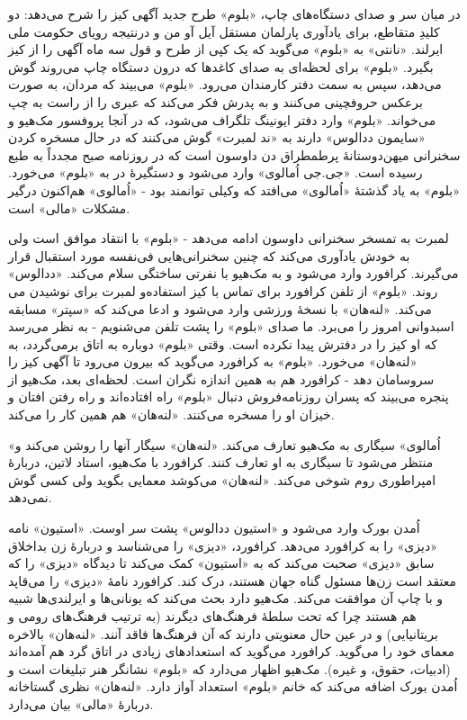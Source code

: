 \documentclass[12pt]{book}
\newcommand{\noun}[1]{«{#1}»}
\begin{document}
    در میان سر و صدای دستگاه‌های چاپ، \noun{بلوم} طرح جدید آگهی کیز را شرح می‌دهد: دو کلیدِ متقاطع، برای یادآوری پارلمان مستقل آیل آو من و درنتیجه رویای حکومت ملی ایرلند. \noun{نانتی} به \noun{بلوم} می‌گوید که یک کپی از طرح و قول سه ماه آگهی را از کیز بگیرد. \noun{بلوم} برای لحظه‌ای به صدای کاغدها که درون دستگاه چاپ می‌روند گوش می‌دهد، سپس به سمت دفتر کارمندان می‌رود. \noun{بلوم} می‌بیند که مردان، به صورت برعکس حروفچینی می‌کنند و به پدرش فکر می‌کند که عبری را از راست به چپ می‌خواند. \noun{بلوم} وارد دفتر ایونینگ تلگراف می‌شود، که در آنجا پروفسور مک‌هیو و \noun{سایمون ددالوس‬} دارند به \noun{ند لمبرت} گوش می‌کنند که در حال مسخره کردن سخنرانی میهن‌دوستانۀ پرطمطراق دن داوسون است که در روزنامه صبح مجدداً به طبع رسیده است. \noun{جی.جی اُمالوی} وارد می‌شود و دستگیرۀ در به \noun{بلوم} می‌خورد. \noun{بلوم} به یاد گذشتۀ \noun{اُمالوی} می‌افتد که وکیلی توانمند بود - \noun{اُمالوی} هم‌اکنون درگیر مشکلات \noun{مالی} است.

    لمبرت به تمسخر سخنرانی داوسون ادامه می‌دهد - \noun{بلوم} با انتقاد موافق است ولی به خودش یادآوری می‌کند که چنین سخنرانی‌هایی فی‌نفسه مورد استقبال قرار می‌گیرند. کرافورد وارد می‌شود و به مک‌هیو با نفرتی ساختگی سلام می‌کند. \noun{ددالوس} و لمبرت برای نوشیدن می‎‌روند. \noun{بلوم} از تلفن کرافورد برای تماس با کیز استفاده می‌کند. \noun{لنه‌هان} با نسخۀ ورزشی وارد می‌شود و ادعا می‌کند که \noun{سپتر} مسابقه اسبدوانی امروز را می‌برد. ما صدای \noun{بلوم} را پشت تلفن می‌شنویم - به نظر می‌رسد که او کیز را در دفترش پیدا نکرده است. وقتی \noun{بلوم} دوباره به اتاق برمی‌گردد، به \noun{لنه‌هان} می‌خورد. \noun{بلوم} به کرافورد می‌گوید که بیرون می‌رود تا آگهی کیز را سروسامان دهد - کرافورد هم به همین اندازه نگران است. لحظه‌ای بعد، مک‌هیو از پنجره می‌بیند که پسران روزنامه‌فروش دنبال \noun{بلوم} راه افتاده‌اند و راه رفتن افتان و خیزان او را مسخره می‌کنند. \noun{لنه‌هان} هم همین کار را می‌کند.

    \noun{اُمالوی} سیگاری به مک‌هیو تعارف می‌کند. \noun{لنه‌هان} سیگار آنها را روشن می‌کند و منتظر می‌شود تا سیگاری به او تعارف کنند. کرافورد با مک‌هیو، استاد لاتین، دربارۀ امپراطوری روم شوخی می‌کند. \noun{لنه‌هان} می‌کوشد معمایی بگوید ولی کسی گوش نمی‌دهد.

    اُمدن بورک وارد می‌شود و \noun{استیون ددالوس} پشت سر اوست. \noun{استیون} نامه \noun{دیزی} را به کرافورد می‌دهد. کرافورد، \noun{دیزی} را می‌شناسد و دربارۀ زن بداخلاق سابق \noun{دیزی} صحبت می‌کند که به \noun{استیون} کمک می‌کند تا دیدگاه \noun{دیزی} را که معتقد است زن‌ها مسئول گناه جهان هستند، درک کند. کرافورد نامۀ \noun{دیزی} را می‌قاپد و با چاپ آن موافقت می‌کند. مک‌هیو دارد بحث می‌کند که یونانی‌ها و ایرلندی‌ها شبیه هم هستند چرا که تحت سلطۀ فرهنگ‌های دیگرند (به ترتیب فرهنگ‌های رومی و بریتانیایی) و در عین حال معنویتی دارند که آن فرهنگ‌ها فاقد آنند. \noun{لنه‌هان} بالاخره معمای خود را می‌گوید. کرافورد می‌گوید که استعدادهای زیادی در اتاق گرد هم آمده‌اند (ادبیات، حقوق، و غیره). مک‌هیو اظهار می‌دارد که \noun{بلوم} نشانگر هنر تبلیغات است و اُمدن بورک اضافه می‌کند که خانم \noun{بلوم} استعداد آواز دارد. \noun{لنه‌هان} نظری گستاخانه دربارۀ \noun{مالی} بیان می‌دارد.
\end{document}

